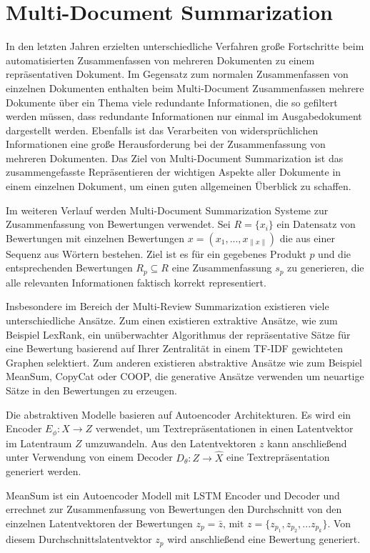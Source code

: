 \section{Multi-Document Summarization}
In den letzten Jahren erzielten unterschiedliche Verfahren große Fortschritte beim automatisierten Zusammenfassen von mehreren Dokumenten zu einem repräsentativen Dokument.
Im Gegensatz zum normalen Zusammenfassen von einzelnen Dokumenten enthalten beim Multi-Document Zusammenfassen mehrere Dokumente über ein Thema viele redundante Informationen, die so gefiltert werden müssen, dass redundante Informationen nur einmal im Ausgabedokument dargestellt werden.
Ebenfalls ist das Verarbeiten von widersprüchlichen Informationen eine große Herausforderung bei der Zusammenfassung von mehreren Dokumenten.
Das Ziel von Multi-Document Summarization ist das zusammengefasste Repräsentieren der wichtigen Aspekte aller Dokumente in einem einzelnen Dokument, um einen guten allgemeinen Überblick zu schaffen.

Im weiteren Verlauf werden Multi-Document Summarization Systeme zur Zusammenfassung von Bewertungen verwendet.
Sei $R= \{x_i \}$ ein Datensatz von Bewertungen mit einzelnen Bewertungen $x=(x_1,...,x_{\| x \|})$ die aus einer Sequenz aus Wörtern bestehen.
Ziel ist es für ein gegebenes Produkt $p$ und die entsprechenden Bewertungen $R_p \subseteq R$ eine Zusammenfassung $s_p$ zu generieren, die alle relevanten Informationen faktisch korrekt representiert.


Insbesondere im Bereich der Multi-Review Summarization existieren viele unterschiedliche Ansätze.
Zum einen existieren extraktive Ansätze, wie zum Beispiel LexRank, ein unüberwachter Algorithmus der repräsentative Sätze für eine Bewertung basierend auf Ihrer Zentralität in einem TF-IDF gewichteten Graphen selektiert.
Zum anderen existieren abstraktive Ansätze wie zum Beispiel MeanSum, CopyCat oder COOP, die generative Ansätze verwenden um neuartige Sätze in den Bewertungen zu erzeugen.

Die abstraktiven Modelle basieren auf Autoencoder Architekturen. Es wird ein Encoder $E_\phi : X \rightarrow Z$ verwendet, um Textrepräsentationen in einen Latentvektor im Latentraum $Z$ umzuwandeln.
Aus den Latentvektoren $z$ kann anschließend unter Verwendung von einem Decoder $D_\theta : Z \rightarrow \hat{X}$ eine Textrepräsentation generiert werden.


MeanSum ist ein Autoencoder Modell mit LSTM Encoder und Decoder und errechnet zur Zusammenfassung von Bewertungen den Durchschnitt von den einzelnen Latentvektoren der Bewertungen $z_p = \bar{z} \text{, mit } z=\{z_{p_1},z_{p_2},...z_{p_k}\}$.
Von diesem Durchschnittslatentvektor $z_p$ wird anschließend eine Bewertung generiert. 


